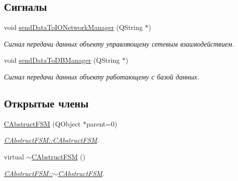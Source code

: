 \subsection*{Сигналы}
\begin{DoxyCompactItemize}
\item 
\hypertarget{class_c_abstruct_f_s_m_a542570a7469e3923eeace7c3c308ff97}{}\label{class_c_abstruct_f_s_m_a542570a7469e3923eeace7c3c308ff97} 
void \hyperlink{class_c_abstruct_f_s_m_a542570a7469e3923eeace7c3c308ff97}{send\+Data\+To\+I\+O\+Network\+Manager} (Q\+String $\ast$)
\begin{DoxyCompactList}\small\item\em Сигнал передачи данных объекту управляющему сетевым взаимодействием. \end{DoxyCompactList}\item 
\hypertarget{class_c_abstruct_f_s_m_a8b3e4a9134df07825f357d16e6d7c436}{}\label{class_c_abstruct_f_s_m_a8b3e4a9134df07825f357d16e6d7c436} 
void \hyperlink{class_c_abstruct_f_s_m_a8b3e4a9134df07825f357d16e6d7c436}{send\+Data\+To\+D\+B\+Manager} (Q\+String $\ast$)
\begin{DoxyCompactList}\small\item\em Сигнал передачи данных объекту работающему с базой данных. \end{DoxyCompactList}\end{DoxyCompactItemize}
\subsection*{Открытые члены}
\begin{DoxyCompactItemize}
\item 
\hyperlink{class_c_abstruct_f_s_m_a54037c986f6b437c50d5e8ba42063330}{C\+Abstruct\+F\+SM} (Q\+Object $\ast$parent=0)
\begin{DoxyCompactList}\small\item\em \hyperlink{class_c_abstruct_f_s_m_a54037c986f6b437c50d5e8ba42063330}{C\+Abstruct\+F\+S\+M\+::\+C\+Abstruct\+F\+SM}. \end{DoxyCompactList}\item 
\hypertarget{class_c_abstruct_f_s_m_acef4a425dee5b9705bc6bbff79225bae}{}\label{class_c_abstruct_f_s_m_acef4a425dee5b9705bc6bbff79225bae} 
virtual \hyperlink{class_c_abstruct_f_s_m_acef4a425dee5b9705bc6bbff79225bae}{$\sim$\+C\+Abstruct\+F\+SM} ()
\begin{DoxyCompactList}\small\item\em \hyperlink{class_c_abstruct_f_s_m_acef4a425dee5b9705bc6bbff79225bae}{C\+Abstruct\+F\+S\+M\+::$\sim$\+C\+Abstruct\+F\+SM}. \end{DoxyCompactList}\end{DoxyCompactItemize}
